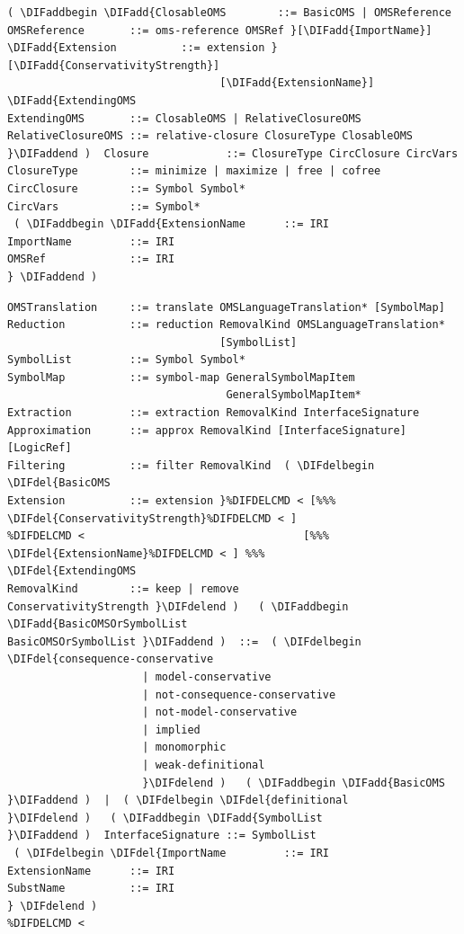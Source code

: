 \documentclass[10pt,fleqn,final]{scrreprt}
\newcommand*{\syntax}[1]{\texttt{#1}}
\providecommand{\DIFadd}[1]{{\protect\color{blue}\uwave{#1}}} %
\providecommand{\DIFdel}[1]{{\protect\color{red}\sout{#1}}}                      %
\providecommand{\DIFaddbegin}{} %
\providecommand{\DIFaddend}{} %
\providecommand{\DIFdelbegin}{} %
\providecommand{\DIFdelend}{} %
\begin{document}
\begin{lstlisting}[language=ebnf,escapeinside={()}]  %DIF >  abstract syntax
( \DIFaddbegin \DIFadd{ClosableOMS        ::= BasicOMS | OMSReference
OMSReference       ::= oms-reference OMSRef }[\DIFadd{ImportName}]
\DIFadd{Extension          ::= extension }[\DIFadd{ConservativityStrength}]
                                 [\DIFadd{ExtensionName}] \DIFadd{ExtendingOMS
ExtendingOMS       ::= ClosableOMS | RelativeClosureOMS
RelativeClosureOMS ::= relative-closure ClosureType ClosableOMS
}\DIFaddend )  Closure            ::= ClosureType CircClosure CircVars
ClosureType        ::= minimize | maximize | free | cofree
CircClosure        ::= Symbol Symbol*
CircVars           ::= Symbol*
 ( \DIFaddbegin \DIFadd{ExtensionName      ::= IRI
ImportName         ::= IRI
OMSRef             ::= IRI
} \DIFaddend )
\end{lstlisting}


\begin{lstlisting}[language=ebnf,escapeinside={()}]  %DIF >  abstract syntax
OMSTranslation     ::= translate OMSLanguageTranslation* [SymbolMap]
Reduction          ::= reduction RemovalKind OMSLanguageTranslation*
                                 [SymbolList]
SymbolList         ::= Symbol Symbol*
SymbolMap          ::= symbol-map GeneralSymbolMapItem
                                  GeneralSymbolMapItem*
Extraction         ::= extraction RemovalKind InterfaceSignature
Approximation      ::= approx RemovalKind [InterfaceSignature] [LogicRef]
Filtering          ::= filter RemovalKind  ( \DIFdelbegin \DIFdel{BasicOMS
Extension          ::= extension }%DIFDELCMD < [%%%
\DIFdel{ConservativityStrength}%DIFDELCMD < ]
%DIFDELCMD <                                  [%%%
\DIFdel{ExtensionName}%DIFDELCMD < ] %%%
\DIFdel{ExtendingOMS
RemovalKind        ::= keep | remove
ConservativityStrength }\DIFdelend )   ( \DIFaddbegin \DIFadd{BasicOMSOrSymbolList
BasicOMSOrSymbolList }\DIFaddend )  ::=  ( \DIFdelbegin \DIFdel{consequence-conservative
                     | model-conservative
                     | not-consequence-conservative
                     | not-model-conservative
                     | implied
                     | monomorphic
                     | weak-definitional
                     }\DIFdelend )   ( \DIFaddbegin \DIFadd{BasicOMS }\DIFaddend )  |  ( \DIFdelbegin \DIFdel{definitional
}\DIFdelend )   ( \DIFaddbegin \DIFadd{SymbolList
}\DIFaddend )  InterfaceSignature ::= SymbolList
 ( \DIFdelbegin \DIFdel{ImportName         ::= IRI
ExtensionName      ::= IRI
SubstName          ::= IRI
} \DIFdelend )
%DIFDELCMD < 
\end{lstlisting}
\end{document}
